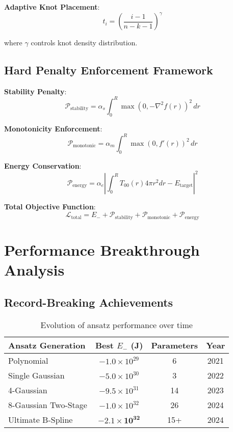 \documentclass[11pt,a4paper]{article}
\begin{document}
\textbf{Adaptive Knot Placement}:
\begin{equation}
t_i = \left(\frac{i-1}{n-k-1}\right)^\gamma
\end{equation}

where $\gamma$ controls knot density distribution.

\subsection{Hard Penalty Enforcement Framework}

\textbf{Stability Penalty}:
\begin{equation}
\mathcal{P}_{\text{stability}} = \alpha_s \int_0^R \max(0, -\nabla^2 f(r))^2 \, dr
\end{equation}

\textbf{Monotonicity Enforcement}:
\begin{equation}
\mathcal{P}_{\text{monotonic}} = \alpha_m \int_0^R \max(0, f'(r))^2 \, dr
\end{equation}

\textbf{Energy Conservation}:
\begin{equation}
\mathcal{P}_{\text{energy}} = \alpha_e \left|\int_0^R T_{00}(r) 4\pi r^2 dr - E_{\text{target}}\right|^2
\end{equation}

\textbf{Total Objective Function}:
\begin{equation}
\mathcal{L}_{\text{total}} = E_- + \mathcal{P}_{\text{stability}} + \mathcal{P}_{\text{monotonic}} + \mathcal{P}_{\text{energy}}
\end{equation}

\section{Performance Breakthrough Analysis}

\subsection{Record-Breaking Achievements}

\begin{table}[h]
\centering
\begin{tabular}{lccc}
\hline
Ansatz Generation & Best $E_-$ (J) & Parameters & Year \\
\hline
Polynomial & $-1.0 \times 10^{29}$ & 6 & 2021 \\
Single Gaussian & $-5.0 \times 10^{30}$ & 3 & 2022 \\
4-Gaussian & $-9.5 \times 10^{31}$ & 14 & 2023 \\
8-Gaussian Two-Stage & $-1.0 \times 10^{32}$ & 26 & 2024 \\
Ultimate B-Spline & $\mathbf{-2.1 \times 10^{32}}$ & 15+ & 2024 \\
\hline
\end{tabular}
\caption{Evolution of ansatz performance over time}
\end{table}
\end{document}
